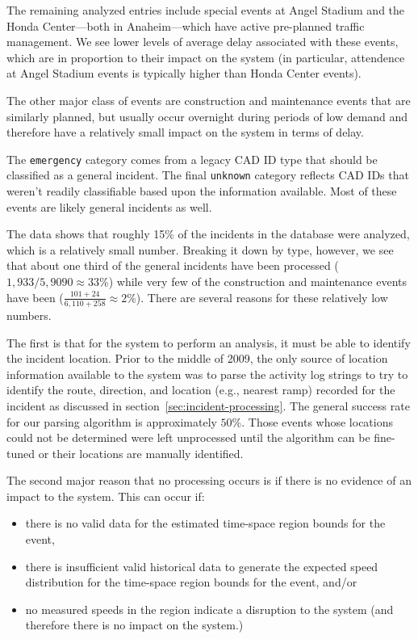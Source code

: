 \documentclass[12pt]{report}
\newcounter{time}
\newcounter{space}
\begin{document}
The remaining analyzed entries include special events at Angel Stadium and the
Honda Center---both in Anaheim---which have active pre-planned traffic
management.  We see lower levels of average delay associated with these events,
which are in proportion to their impact on the system (in particular, attendence
at Angel Stadium events is typically higher than Honda Center events).

The other major class of events are construction and maintenance events that are
similarly planned, but usually occur overnight during periods of low demand and
therefore have a relatively small impact on the system in terms of delay.

The \texttt{emergency} category comes from a legacy \ac{CAD} ID type that should
be classified as a general incident.  The final \texttt{unknown} category
reflects CAD IDs that weren't readily classifiable based upon the information
available.  Most of these events are likely general incidents as well.

The data shows that roughly 15\% of the incidents in the database were analyzed,
which is a relatively small number.  Breaking it down by type, however, we see
that about one third of the general incidents have been processed
($1,933/5,9090\approx{}33\%$) while very few of the construction and maintenance
events have been ($\frac{101+24}{6,110+258} \approx 2\%$).  There are several
reasons for these relatively low numbers.  

The first is that for the system to perform an analysis, it must be able to
identify the incident location.  Prior to the middle of 2009, the only source of
location information available to the system was to parse the activity log
strings to try to identify the route, direction, and location (e.g., nearest
ramp) recorded for the incident as discussed in
section~\ref{sec:incident-processing}.  The general success rate for our parsing
algorithm is approximately $50\%$.  Those events whose locations could not be
determined were left unprocessed until the algorithm can be fine-tuned or their
locations are manually identified.

The second major reason that no processing occurs is if there is no evidence of
an impact to the system.  This can occur if:
\begin{itemize}
\item there is no valid data for the estimated time-space region bounds for the event,
\item there is insufficient valid historical data to generate the expected speed
  distribution for the time-space region bounds for the event, and/or
\item no measured speeds in the region indicate a disruption to the system (and
  therefore there is no impact on the system.)
\end{itemize}
\end{document}
